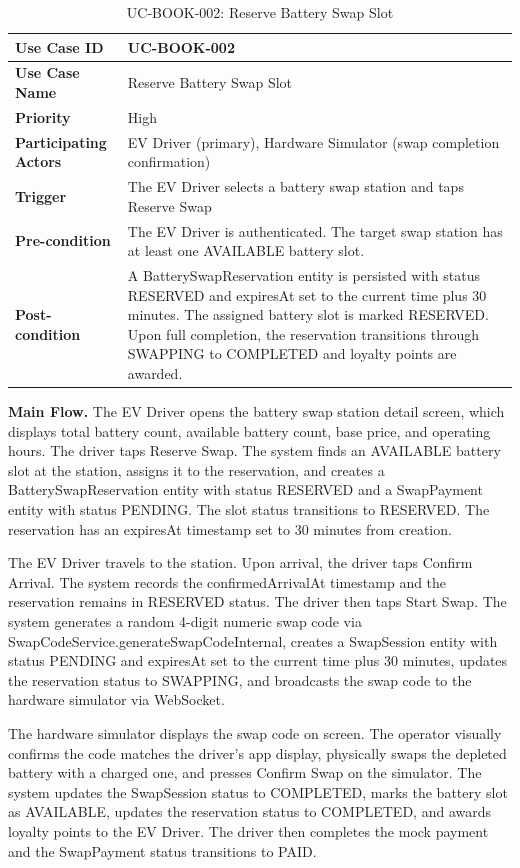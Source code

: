 \documentclass[../Main.tex]{subfiles}
\begin{document}
\begin{table}[H]
\caption{UC-BOOK-002: Reserve Battery Swap Slot}
\label{table:uc-book-002}
\begin{tabular}{|p{3.5cm}|p{12cm}|}
\hline
\textbf{Use Case ID} & UC-BOOK-002 \\ \hline
\textbf{Use Case Name} & Reserve Battery Swap Slot \\ \hline
\textbf{Priority} & High \\ \hline
\textbf{Participating Actors} & EV Driver (primary), Hardware Simulator (swap completion confirmation) \\ \hline
\textbf{Trigger} & The EV Driver selects a battery swap station and taps Reserve Swap \\ \hline
\textbf{Pre-condition} & The EV Driver is authenticated. The target swap station has at least one AVAILABLE battery slot. \\ \hline
\textbf{Post-condition} & A BatterySwapReservation entity is persisted with status RESERVED and expiresAt set to the current time plus 30 minutes. The assigned battery slot is marked RESERVED. Upon full completion, the reservation transitions through SWAPPING to COMPLETED and loyalty points are awarded. \\ \hline
\end{tabular}
\end{table}

\textbf{Main Flow.} The EV Driver opens the battery swap station detail screen, which displays total battery count, available battery count, base price, and operating hours. The driver taps Reserve Swap. The system finds an AVAILABLE battery slot at the station, assigns it to the reservation, and creates a BatterySwapReservation entity with status RESERVED and a SwapPayment entity with status PENDING. The slot status transitions to RESERVED. The reservation has an expiresAt timestamp set to 30 minutes from creation.

The EV Driver travels to the station. Upon arrival, the driver taps Confirm Arrival. The system records the confirmedArrivalAt timestamp and the reservation remains in RESERVED status. The driver then taps Start Swap. The system generates a random 4-digit numeric swap code via SwapCodeService.generateSwapCodeInternal, creates a SwapSession entity with status PENDING and expiresAt set to the current time plus 30 minutes, updates the reservation status to SWAPPING, and broadcasts the swap code to the hardware simulator via WebSocket.

The hardware simulator displays the swap code on screen. The operator visually confirms the code matches the driver's app display, physically swaps the depleted battery with a charged one, and presses Confirm Swap on the simulator. The system updates the SwapSession status to COMPLETED, marks the battery slot as AVAILABLE, updates the reservation status to COMPLETED, and awards loyalty points to the EV Driver. The driver then completes the mock payment and the SwapPayment status transitions to PAID.
\end{document}
